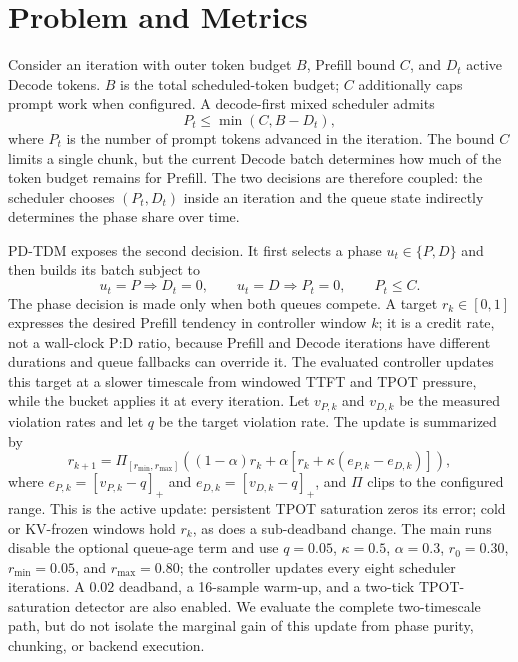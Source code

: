\section{Problem and Metrics}
\label{sec:motivation}

Consider an iteration with outer token budget $B$, Prefill bound $C$, and $D_t$
active Decode tokens. $B$ is the total scheduled-token budget; $C$ additionally
caps prompt work when configured. A decode-first mixed scheduler admits
\begin{equation}
    P_t \leq \min(C, B-D_t),
    \label{eq:mixed-budget}
\end{equation}
where $P_t$ is the number of prompt tokens advanced in the iteration. The
bound $C$ limits a single chunk, but the current Decode batch determines how
much of the token budget remains for Prefill. The two decisions are therefore
coupled: the scheduler chooses $(P_t,D_t)$ inside an iteration and the queue
state indirectly determines the phase share over time.

PD-TDM exposes the second decision. It first selects a phase
$u_t\in\{P,D\}$ and then builds its batch subject to
\begin{equation}
 u_t=P \Rightarrow D_t=0, \qquad
 u_t=D \Rightarrow P_t=0, \qquad P_t\leq C.
 \label{eq:phase-invariant}
\end{equation}
The phase decision is made only when both queues compete. A target
$r_k\in[0,1]$ expresses the desired Prefill tendency in controller window $k$;
it is a credit rate, not a wall-clock P:D ratio, because Prefill and Decode
iterations have different durations and queue fallbacks can override it. The
evaluated controller updates this target at a slower timescale from windowed
TTFT and TPOT pressure, while the bucket applies it at every iteration. Let
$v_{P,k}$ and $v_{D,k}$ be the measured violation rates and let $q$ be the
target violation rate. The update is summarized by
\begin{equation}
 r_{k+1}=\Pi_{[r_{\min},r_{\max}]}
 \left((1-\alpha)r_k+\alpha\left[r_k+\kappa(e_{P,k}-e_{D,k})\right]\right),
 \label{eq:ratio-update}
\end{equation}
where $e_{P,k}=[v_{P,k}-q]_+$ and $e_{D,k}=[v_{D,k}-q]_+$, and $\Pi$ clips to
the configured range. This is the active update: persistent TPOT saturation
zeros its error; cold or KV-frozen windows hold $r_k$, as does a sub-deadband
change. The main runs disable the optional queue-age term and use $q=0.05$,
$\kappa=0.5$, $\alpha=0.3$,
$r_0=0.30$, $r_{\min}=0.05$, and $r_{\max}=0.80$; the controller updates
every eight scheduler iterations. A $0.02$ deadband, a 16-sample warm-up,
and a two-tick TPOT-saturation detector are also enabled. We evaluate the
complete two-timescale path, but do not isolate the marginal gain of this
update from phase purity, chunking, or backend execution.

